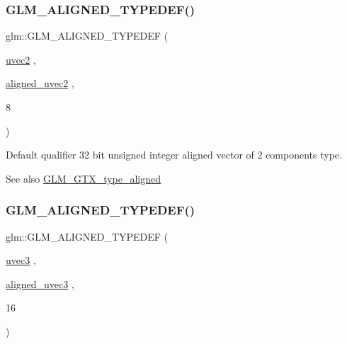 \subsubsection{\texorpdfstring{G\+L\+M\+\_\+\+A\+L\+I\+G\+N\+E\+D\+\_\+\+T\+Y\+P\+E\+D\+E\+F()}{GLM\_ALIGNED\_TYPEDEF()}\hspace{0.1cm}{\footnotesize\ttfamily [118/209]}}
{\footnotesize\ttfamily glm\+::\+G\+L\+M\+\_\+\+A\+L\+I\+G\+N\+E\+D\+\_\+\+T\+Y\+P\+E\+D\+EF (\begin{DoxyParamCaption}\item[{\hyperlink{group__core__types_gafd2041b45eff671aa8899d2c2835eee9}{uvec2}}]{,  }\item[{\hyperlink{group__gtc__type__aligned_gacddd39189c2dedf7dd48c02155279124}{aligned\+\_\+uvec2}}]{,  }\item[{8}]{ }\end{DoxyParamCaption})}

Default qualifier 32 bit unsigned integer aligned vector of 2 components type. \begin{DoxySeeAlso}{See also}
\hyperlink{group__gtx__type__aligned}{G\+L\+M\+\_\+\+G\+T\+X\+\_\+type\+\_\+aligned} 
\end{DoxySeeAlso}
\mbox{\label{group__gtx__type__aligned_ga5cec574686a7f3c8ed24bb195c5e2d0a}} 
\subsubsection{\texorpdfstring{G\+L\+M\+\_\+\+A\+L\+I\+G\+N\+E\+D\+\_\+\+T\+Y\+P\+E\+D\+E\+F()}{GLM\_ALIGNED\_TYPEDEF()}\hspace{0.1cm}{\footnotesize\ttfamily [119/209]}}
{\footnotesize\ttfamily glm\+::\+G\+L\+M\+\_\+\+A\+L\+I\+G\+N\+E\+D\+\_\+\+T\+Y\+P\+E\+D\+EF (\begin{DoxyParamCaption}\item[{\hyperlink{group__core__types_gac4ba593917841b859ba1683b8b52b8fa}{uvec3}}]{,  }\item[{\hyperlink{group__gtc__type__aligned_ga5dee635ca69be0f5de5630a59d89034f}{aligned\+\_\+uvec3}}]{,  }\item[{16}]{ }\end{DoxyParamCaption})}

